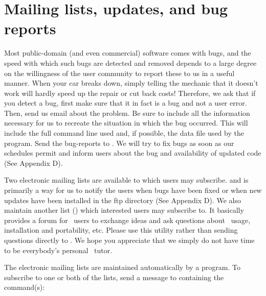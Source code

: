 %
%
\chapter{Mailing lists, updates, and bug reports}
\thispagestyle{headings}

Most public-domain (and even commercial) software comes
with bugs, and the speed with which such bugs are detected
and removed depends to a large degree on the willingness
of the user community to report these to us in a useful
manner.  When your car breaks down, simply telling the
mechanic that it doesn't work will hardly speed up the
repair or cut back costs!  Therefore, we ask that if
you detect a bug, first make sure that it in fact is a
bug and not a user error.  Then, send us email about the
problem.  Be sure to include all the information necessary
for us to recreate the situation in which the bug occurred.
This will include the full command line used and, if
possible, the data file used by the program.  Send the
bug-reports to
.
We will try to fix bugs as soon as our schedules permit and
inform users about the bug and availability of updated code
(See Appendix D).

Two electronic mailing lists are available to which
users may subscribe. 
and is primarily a way for us to notify the users when bugs
have been fixed or when new updates have been installed in
the ftp directory (See Appendix D).  We also maintain another list
() which interested users may
subscribe to.  It basically provides a forum for \GMT\ users
to exchange ideas and ask questions about \GMT\ usage,
installation and portability, etc. Please use this utility
rather than sending questions directly to
.
We hope you appreciate that we simply do not have time to be
everybody's personal \GMT\ tutor.

The electronic mailing lists are maintained automatically
by a program.  To subscribe to one or both of the lists,
send a message to
containing the command(s):

